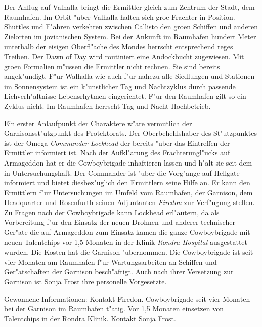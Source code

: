 Der Anflug auf Valhalla bringt die Ermittler gleich zum Zentrum der Stadt, dem Raumhafen. Im Orbit "uber Valhalla halten sich gro\3e Frachter in Position. Shuttles und F"ahren verkehren zwischen Callisto den gro\3en Schiffen und anderen Zielorten im jovianischen System. Bei der Ankunft im Raumhafen hundert Meter unterhalb der eisigen Oberfl"ache des Mondes herrscht entsprechend reges Treiben. Der Dawn of Day wird routiniert eine Andockbucht zugewiesen. Mit gro\3en Formalien m"ussen die Ermittler nicht rechnen. Sie sind bereits angek"undigt. F"ur Walhalla wie auch f"ur nahezu alle Siedlungen und Stationen im Sonnensystem ist ein k"unstlicher Tag und Nachtzyklus durch passende Lichverh"altnisse Lebensrhytmen eingerichtet. F"ur den Raumhafen gilt so ein Zyklus nicht. Im Raumhafen herrscht Tag und Nacht Hochbetrieb. 


Ein erster Anlaufpunkt der Charaktere w"are vermutlich der Garnisonsst"utzpunkt des Protektorats. Der Oberbehehlshaber des St"utzpunktes ist der Omega \emph{Commander Lockhead} der bereits "uber das Eintreffen der Ermittler informiert ist. Nach der Aufkl"arung des Frachterungl"ucks auf Armageddon hat er die Cowboybrigade inhaftieren lassen und h"alt sie seit dem in Untersuchungshaft. Der Commander ist "uber die Vorg"ange auf Hellgate informiert und bietet diesbez"uglich den Ermittlern seine Hilfe an. Er kann den Ermittlern f"ur Untersuchungen im Umfeld vom Raumhafen, der Garnison, dem Headquarter und Rosenfurth seinen Adjuntanten \emph{Firedon} zur Verf"ugung stellen. Zu Fragen nach der Cowboybrigade kann Lockhead erl"autern, da\3 als Vorbereitung f"ur den Einsatz der neuen Drohnen und anderer technischer Ger"ate die auf Armageddon zum Einsatz kamen die ganze Cowboybrigade mit neuen Talentchips vor 1,5 Monaten in der Klinik \emph{Rondra Hospital} ausgestattet wurden. Die Kosten hat die Garnison "ubernommen. Die Cowboybrigade ist seit vier Monaten am Raumhafen f"ur Wartungsarbeiten an Schiffen und Ger"atschaften der Garnison besch"aftigt. Auch nach ihrer Versetzung zur Garnison ist Sonja Frost ihre personelle Vorgesetzte.

\begin{remarks}
	Gewonnene Informationen: Kontakt Firedon. Cowboybrigade seit vier Monaten bei der Garnison im Raumhafen t"atig. Vor 1,5 Monaten einsetzen von Talentchips in der Rondra Klinik. Kontakt Sonja Frost.
\end{remarks}



